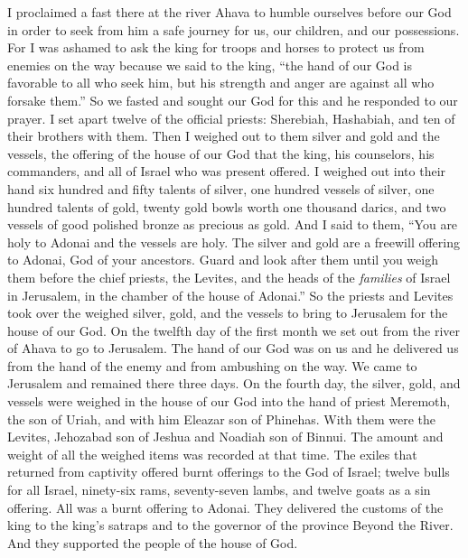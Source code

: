 \begin{biblechapter}
 I proclaimed a fast there at the river Ahava to humble ourselves before our God in order to seek from him a safe journey for us, our children, and our possessions.
\verse For I was ashamed to ask the king for troops and horses to protect us from enemies on the way because we said to the king, “the hand of our God is favorable to all who seek him, but his strength and anger are against all who forsake them.”
\verse So we fasted and sought our God for this and he responded to our prayer.
 I set apart twelve of the official priests: Sherebiah, Hashabiah, and ten of their brothers with them.
\verse Then I weighed out to them silver and gold and the vessels, the offering of the house of our God that the king, his counselors, his commanders, and all of Israel who was present offered.
\verse I weighed out into their hand six hundred and fifty talents of silver, one hundred vessels of silver, one hundred talents of gold,
\verse twenty gold bowls worth one thousand darics, and two vessels of good polished bronze as precious as gold.
\verse And I said to them, “You are holy to Adonai and the vessels are holy. The silver and gold are a freewill offering to Adonai, God of your ancestors.
\verse Guard and look after them until you weigh them before the chief priests, the Levites, and the heads of the \textit{families} of Israel in Jerusalem, in the chamber of the house of Adonai.”
\verse So the priests and Levites took over the weighed silver, gold, and the vessels to bring to Jerusalem for the house of our God.
 On the twelfth day of the first month we set out from the river of Ahava to go to Jerusalem. The hand of our God was on us and he delivered us from the hand of the enemy and from ambushing on the way.
\verse We came to Jerusalem and remained there three days.
\verse On the fourth day, the silver, gold, and vessels were weighed in the house of our God into the hand of priest Meremoth, the son of Uriah, and with him Eleazar son of Phinehas. With them were the Levites, Jehozabad son of Jeshua and Noadiah son of Binnui.
\verse The amount and weight of all the weighed items was recorded at that time.
\verse The exiles that returned from captivity offered burnt offerings to the God of Israel; twelve bulls for all Israel, ninety-six rams, seventy-seven lambs, and twelve goats as a sin offering. All was a burnt offering to Adonai.
\verse They delivered the customs of the king to the king’s satraps and to the governor of the province Beyond the River. And they supported the people of the house of God.
\end{biblechapter}

